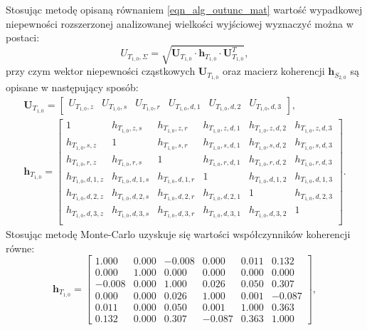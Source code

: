 Stosując metodę opisaną równaniem \eqref{eqn_alg_outunc_mat} wartość wypadkowej niepewności rozszerzonej analizowanej wielkości wyjściowej wyznaczyć można w postaci:
\begin{equation}
U_{T_{1,0},\Sigma} = \sqrt{\mathbf{U}_{T_{1,0}} \cdot \mathbf{h}_{T_{1,0}} \cdot \mathbf{U}_{T_{1,0}}^{T}} \label{eqn_sym_partd_output_unc_summul_T_1_0},
\end{equation}
przy czym wektor niepewności cząstkowych $\mathbf{U}_{T_{1,0}}$ oraz macierz koherencji $\mathbf{h}_{S_{2,0}}$ są opisane w następujący sposób:
\begin{gather}
\mathbf{U}_{T_{1,0}} =
\begin{bmatrix}
U_{T_{1,0},z} & U_{T_{1,0},s} & U_{T_{1,0},r} & U_{T_{1,0},d,1} & U_{T_{1,0},d,2} & U_{T_{1,0},d,3}
\end{bmatrix}
\label{eqn_sym_partd_output_unc_sumuvect_T_1_0}, \\
\mathbf{h}_{T_{1,0}} =
\begin{bmatrix}
1                 & h_{T_{1,0},z,s}   & h_{T_{1,0},z,r}   & h_{T_{1,0},z,d,1} & h_{T_{1,0},z,d,2} & h_{T_{1,0},z,d,3} \\
h_{T_{1,0},s,z}   & 1                 & h_{T_{1,0},s,r}   & h_{T_{1,0},s,d,1} & h_{T_{1,0},s,d,2} & h_{T_{1,0},s,d,3} \\
h_{T_{1,0},r,z}   & h_{T_{1,0},r,s}   & 1                 & h_{T_{1,0},r,d,1} & h_{T_{1,0},r,d,2} & h_{T_{1,0},r,d,3} \\
h_{T_{1,0},d,1,z} & h_{T_{1,0},d,1,s} & h_{T_{1,0},d,1,r} & 1                 & h_{T_{1,0},d,1,2} & h_{T_{1,0},d,1,3} \\
h_{T_{1,0},d,2,z} & h_{T_{1,0},d,2,s} & h_{T_{1,0},d,2,r} & h_{T_{1,0},d,2,1} & 1                 & h_{T_{1,0},d,2,3} \\
h_{T_{1,0},d,3,z} & h_{T_{1,0},d,3,s} & h_{T_{1,0},d,3,r} & h_{T_{1,0},d,3,1} & h_{T_{1,0},d,3,2} & 1                 \\
\end{bmatrix}
\label{eqn_sym_partd_output_unc_sumcoher_T_1_0}.
\end{gather}
Stosując metodę Monte-Carlo uzyskuje się wartości współczynników koherencji równe:
\begin{equation}
\mathbf{h}_{T_{1,0}} =
\begin{bmatrix}
1.000  & 0.000 & -0.008 & 0.000  & 0.011 & 0.132  \\
0.000  & 1.000 & 0.000  & 0.000  & 0.000 & 0.000  \\
-0.008 & 0.000 & 1.000  & 0.026  & 0.050 & 0.307  \\
0.000  & 0.000 & 0.026  & 1.000  & 0.001 & -0.087 \\
0.011  & 0.000 & 0.050  & 0.001  & 1.000 & 0.363  \\
0.132  & 0.000 & 0.307  & -0.087 & 0.363 & 1.000
\end{bmatrix}
\label{eqn_sym_partd_output_unc_sumcoherval_T_1_0},
\end{equation}
